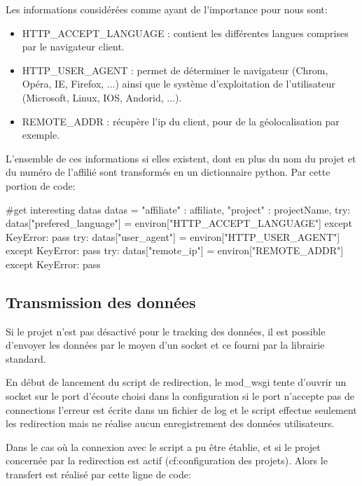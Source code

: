 Les informations considérées comme ayant de l'importance pour nous sont:

\begin{itemize}
\item HTTP\_ACCEPT\_LANGUAGE : contient les différentes langues comprises par le navigateur client.
\item HTTP\_USER\_AGENT : permet de déterminer le navigateur (Chrom, Opéra, IE, Firefox, ...) ainsi que le système d'exploitation de l'utilisateur (Microsoft, Linux, IOS, Andorid, ...).
\item REMOTE\_ADDR : récupère l'ip du client, pour de la géolocalisation par exemple.
\end{itemize}

L'ensemble de ces informations si elles existent, dont en plus du nom du projet et du numéro de l'affilié sont transformés en un dictionnaire python. Par cette portion de code:

\begin{python}
#get interesting datas
datas = {
    "affiliate"        : affiliate,
    "project"          : projectName,
}
try:
    datas["prefered_language"] = environ["HTTP_ACCEPT_LANGUAGE"]
except KeyError:
    pass
try:
    datas["user_agent"]        = environ["HTTP_USER_AGENT"]
except KeyError:
    pass
try:
    datas["remote_ip"]         = environ["REMOTE_ADDR"]
except KeyError:
    pass
\end{python}


\subsection*{Transmission des données}

Si le projet n'est pas désactivé pour le tracking des données, il est possible d'envoyer les données par le moyen d'un socket et ce fourni par la librairie standard.

En début de lancement du script de redirection, le mod\_wsgi tente d'ouvrir un socket sur le port d'écoute choisi dans la configuration si le port n'accepte pas de connections l'erreur est écrite dans un fichier de log et le script effectue seulement les redirection mais ne réalise aucun enregistrement des données utilisateurs.

Dans le cas où la connexion avec le script a pu être établie, et si le projet concernée par la redirection est actif (cf:configuration des projets). Alors le transfert est réalisé par cette ligne de code:


